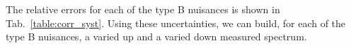 The relative errors for each of the type B nuisances is shown in Tab.~\ref{table:corr_syst}. Using these uncertainties, we can build, for each of the type B nuisances, a varied up and a varied down measured spectrum.
